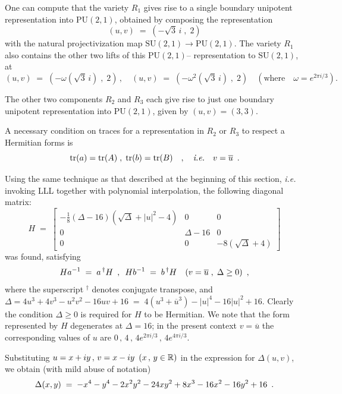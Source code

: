 One can compute that the variety $R_1$ gives rise to a single boundary
unipotent representation into $\mathrm{PU(2,1)}$, obtained by composing the representation
\[ (u , v) \;=\; (-\sqrt{3}\,i \;,\; 2) \]
with the natural projectivization map $\mathrm{SU(2,1) \to PU(2,1)}$.  The variety
$R_1$ also contains the other two lifts of this $\mathrm{PU(2,1)}$--
representation to $\mathrm{SU(2,1)}$, at
\[ (u , v) \;=\; (-\omega(\sqrt{3}\,i) \;,\; 2) \, ,\quad
   (u , v) \;=\; (-\omega^2(\sqrt{3}\,i) \;,\; 2) \quad
   (\text{where}\quad \omega = e^{2\pi i/3}).\]

\bigskip

The other two components $R_2$ and $R_3$ each give rise to just one boundary unipotent representation into
$\mathrm{PU(2,1)}$, given by $(u,v) = (3,3)$.
\vv

A necessary condition on traces for a representation in $R_2$ or $R_3$ to respect a Hermitian
forms is
\[ \mathrm{tr}(a) = \mathrm{tr}(A) \;,\; \mathrm{tr}(b) = \mathrm{tr}(B) \quad,\quad\text{\it i.e.}\quad v = \overline{u} \hspace{.5em}.\]

Using the same technique as that described at the beginning of this section,
{\it i.e.} invoking LLL together with polynomial interpolation, the following diagonal matrix:
\[ H \;=\; \left[\begin{array}{ccc}
-\frac{1}{8}(\Delta - 16)\left(\sqrt{\Delta} + |u|^2 - 4 \right) & 0 & 0\\
0 & \Delta - 16 & 0\\
0 & 0 & -8\left(\sqrt{\Delta} + 4 \right)
\end{array}\right] \]
was found, satisfying
\[ H a^{-1} \;=\; a^{\,\dagger}H \hspace{.5em},\hspace{.5em} H b^{-1} \;=\; b^{\,\dagger}H
\quad (v = \overline{u} \;,\; \Delta \geq 0) \hspace{.5em},\]
where the superscript $^\dagger$ denotes conjugate transpose, and
$\Delta = 4 u^3 + 4 v^3 - u^2 v^2 - 16 u v + 16 \;=\;
4(u^3 + \overline{u}^3) - |u|^4 - 16|u|^2 + 16$.
Clearly the condition $\Delta \geq 0$ is required for $H$ to be Hermitian.  We note that
the form represented by $H$ degenerates at $\Delta = 16$; in the present context $v = \overline{u}$
the corresponding values of $u$ are $0 \,,\, 4 \,,\, 4e^{2\pi i/3} \,,\, 4e^{4\pi i/3}$.
\vv

Substituting $u = x + iy \,,\, v = x - iy \hspace{.5em} (x \,,\, y \in \mathbb R)$ in the expression for
$\Delta(u,v)$, we obtain (with mild abuse of notation)
\[ \Delta(x,y) \;=\; -x^4 - y^4 - 2x^2 y^2 - 24x y^2 + 8x^3 - 16x^2 - 16y^2 + 16 \hspace{.5em}.\]
\ind

